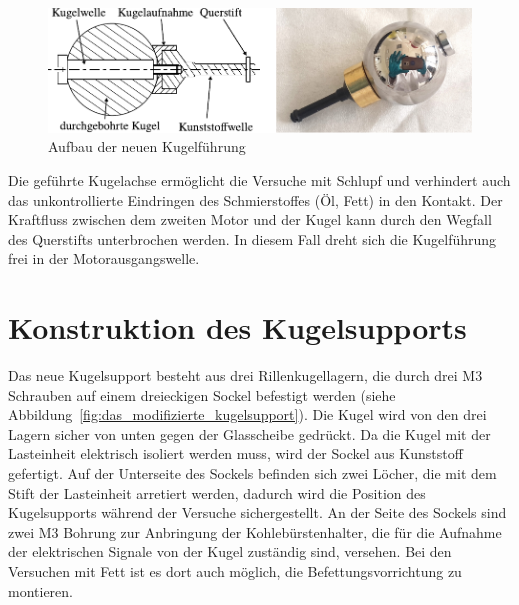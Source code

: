 \begin{figure}[htb]
    \centering
    \includegraphics[]{./images/kugelfuehrung.pdf}
    \caption{Aufbau der neuen Kugelführung}
    \label{fig:aufbau_der_neuen_kugelfuehrung}
\end{figure}

Die geführte Kugelachse ermöglicht die Versuche mit Schlupf und verhindert auch das unkontrollierte Eindringen des Schmierstoffes (Öl, Fett) in den Kontakt.
Der Kraftfluss zwischen dem zweiten Motor und der Kugel kann durch den Wegfall des Querstifts unterbrochen werden.
In diesem Fall dreht sich die Kugelführung frei in der Motorausgangswelle.

\section{Konstruktion des Kugelsupports}
\label{sec:konstruktion_des_kugelsupports}

Das neue Kugelsupport besteht aus drei Rillenkugellagern, die durch drei M3 Schrauben auf einem dreieckigen Sockel befestigt werden (siehe Abbildung~\ref{fig:das_modifizierte_kugelsupport}).
Die Kugel wird von den drei Lagern sicher von unten gegen der Glasscheibe gedrückt.
Da die Kugel mit der Lasteinheit elektrisch isoliert werden muss, wird der Sockel aus Kunststoff gefertigt.
Auf der Unterseite des Sockels befinden sich zwei Löcher, die mit dem Stift der Lasteinheit arretiert werden, dadurch wird die Position des Kugelsupports während der Versuche sichergestellt.
An der Seite des Sockels sind zwei M3 Bohrung zur Anbringung der Kohlebürstenhalter, die für die Aufnahme der elektrischen Signale von der Kugel zuständig sind, versehen.
Bei den Versuchen mit Fett ist es dort auch möglich, die Befettungsvorrichtung zu montieren.

